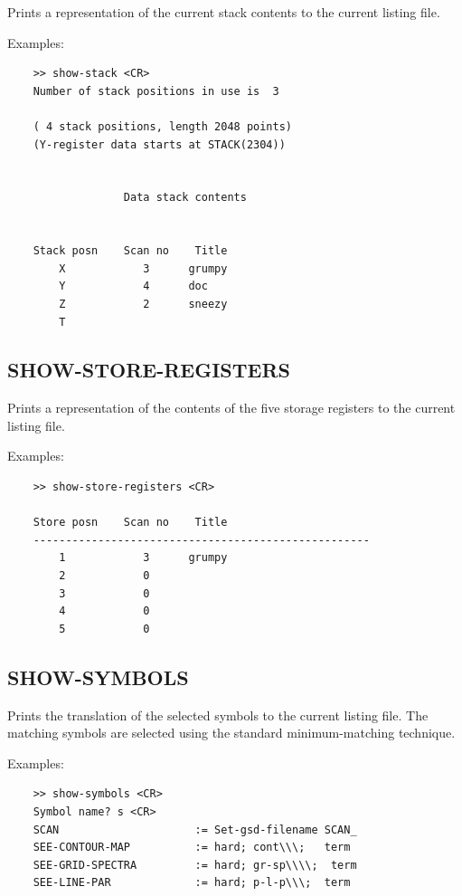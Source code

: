 \documentclass[11pt,twoside]{report}
\begin{document}
Prints a representation of the current stack contents to the current
listing file.

Examples:
\begin{verbatim}
    >> show-stack <CR>
    Number of stack positions in use is  3

    ( 4 stack positions, length 2048 points)
    (Y-register data starts at STACK(2304))


                  Data stack contents


    Stack posn    Scan no    Title
        X            3      grumpy                    
        Y            4      doc                       
        Z            2      sneezy                    
        T                                             
\end{verbatim}

\subsection{SHOW-STORE-REGISTERS} 

Prints a representation of the contents of the five storage registers
to the current listing file.

Examples:
\begin{verbatim}
    >> show-store-registers <CR>

    Store posn    Scan no    Title
    ----------------------------------------------------
        1            3      grumpy                    
        2            0      
        3            0      
        4            0      
        5            0      
\end{verbatim}

\subsection{SHOW-SYMBOLS} 

Prints the translation of the selected symbols to the current
listing file. The matching symbols are selected using the standard
minimum-matching technique. 

Examples:
\begin{verbatim}
    >> show-symbols <CR>
    Symbol name? s <CR>
    SCAN                     := Set-gsd-filename SCAN_
    SEE-CONTOUR-MAP          := hard; cont\\\;   term
    SEE-GRID-SPECTRA         := hard; gr-sp\\\\;  term
    SEE-LINE-PAR             := hard; p-l-p\\\;  term
\end{verbatim}
\end{document}
